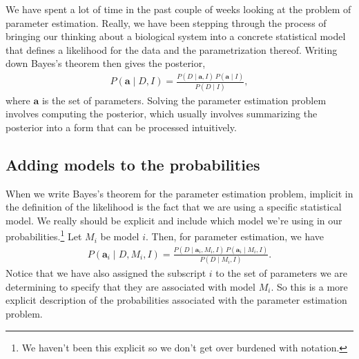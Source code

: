We have spent a lot of time in the past couple of weeks looking at the
problem of parameter estimation.  Really, we have been stepping
through the process of bringing our thinking about a biological system
into a concrete statistical model that defines a
likelihood for the data and the parametrization thereof.  Writing down
Bayes's theorem then gives the posterior,
\begin{align}
P(\mathbf{a}\mid D, I) =
\frac{P(D\mid \mathbf{a},I)\,P(\mathbf{a}\mid I)}{P(D\mid I)},
\end{align}
where $\mathbf{a}$ is the set of parameters.  Solving the parameter
estimation problem involves computing the posterior, which usually
involves summarizing the posterior into a form that can be processed
intuitively.

\subsection{Adding models to the probabilities}
When we write Bayes's theorem for the parameter estimation problem,
implicit in the definition of the likelihood is the fact that we are
using a specific statistical model.  We
really should be explicit and include which model we're using in our
probabilities.\footnote{We haven't been this explicit so we don't get over burdened with notation.}  Let $M_i$ be model $i$.  Then, for parameter
estimation, we have
\begin{align}
P(\mathbf{a}_i\mid D, M_i, I) =
\frac{P(D\mid \mathbf{a}_i, M_i, I)\,P(\mathbf{a}_i\mid M_i, I)}{P(D\mid M_i, I)}.
\label{eq:param_est}
\end{align}
Notice that we have also assigned the subscript $i$ to the set of
parameters we are determining to specify that they are associated with
model $M_i$.  So this is a more explicit description of the
probabilities associated with the parameter estimation problem.



